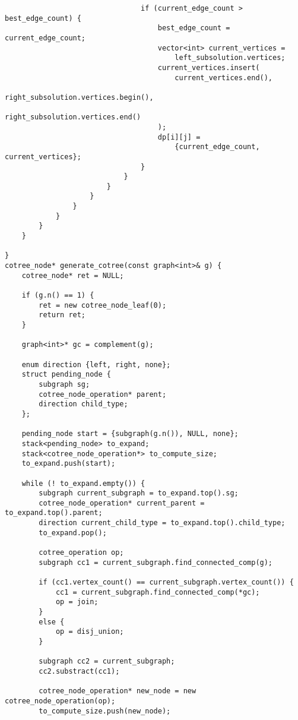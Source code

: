 \begin{lstlisting}
                                if (current_edge_count > best_edge_count) {
                                    best_edge_count = current_edge_count;
                                    vector<int> current_vertices =
                                        left_subsolution.vertices;
                                    current_vertices.insert(
                                        current_vertices.end(),
                                        right_subsolution.vertices.begin(),
                                        right_subsolution.vertices.end()
                                    );
                                    dp[i][j] =
                                        {current_edge_count, current_vertices};
                                }
                            }
                        }
                    }
                }
            }
        }
    }

}
cotree_node* generate_cotree(const graph<int>& g) {
    cotree_node* ret = NULL;

    if (g.n() == 1) {
        ret = new cotree_node_leaf(0);
        return ret;
    }

    graph<int>* gc = complement(g);

    enum direction {left, right, none};
    struct pending_node {
        subgraph sg;
        cotree_node_operation* parent;
        direction child_type;
    };

    pending_node start = {subgraph(g.n()), NULL, none};
    stack<pending_node> to_expand;
    stack<cotree_node_operation*> to_compute_size;
    to_expand.push(start);

    while (! to_expand.empty()) {
        subgraph current_subgraph = to_expand.top().sg;
        cotree_node_operation* current_parent = to_expand.top().parent;
        direction current_child_type = to_expand.top().child_type;
        to_expand.pop();

        cotree_operation op;
        subgraph cc1 = current_subgraph.find_connected_comp(g);

        if (cc1.vertex_count() == current_subgraph.vertex_count()) {
            cc1 = current_subgraph.find_connected_comp(*gc);
            op = join;
        }
        else {
            op = disj_union;
        }

        subgraph cc2 = current_subgraph;
        cc2.substract(cc1);

        cotree_node_operation* new_node = new cotree_node_operation(op);
        to_compute_size.push(new_node);


\end{lstlisting}
